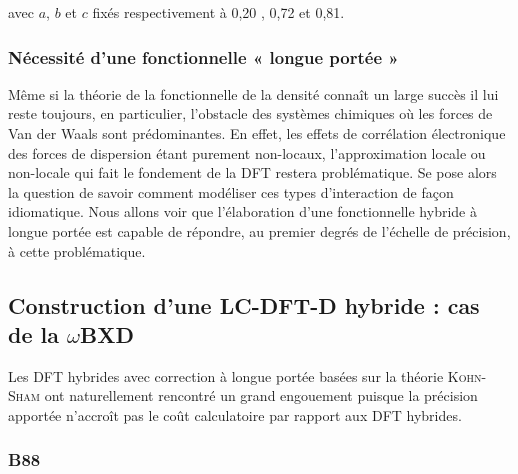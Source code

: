 \noindent avec $a$, $b$ et $c$ fixés respectivement à 0,20 , 0,72 et 0,81.


\subsubsection{Nécessité d'une fonctionnelle « longue portée »}

Même si la théorie de la fonctionnelle de la densité connaît un large succès il lui reste toujours, en particulier, l'obstacle des systèmes chimiques où les forces de Van der Waals sont prédominantes. En effet, les effets de corrélation électronique des forces de dispersion étant purement non-locaux, l'approximation locale ou non-locale qui fait le fondement de la DFT restera problématique. Se pose alors la question de savoir comment modéliser ces types d'interaction de façon idiomatique. Nous allons voir que l'élaboration d'une fonctionnelle hybride à longue portée est capable de répondre, au premier degrés de l’échelle de précision, à cette problématique.

\subsection[LC-DFT-D hybride : $\omega$BXD]{Construction d'une LC-DFT-D hybride : cas de la $\omega$BXD}

Les DFT hybrides avec correction à longue portée basées sur la théorie \textsc{Kohn-Sham} ont naturellement rencontré un grand engouement puisque la précision apportée n'accroît pas le coût calculatoire par rapport aux DFT hybrides.

\subsubsection{B88}

